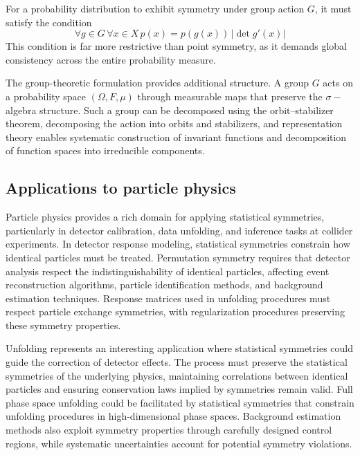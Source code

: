         For a probability distribution to exhibit symmetry under group action \(G\), it must satisfy the condition
        \[
            \forall g\in G\,\forall x\in X\,p(x) = p(g(x))\,|\det g'(x)|
        \]
        This condition is far more restrictive than point symmetry, as it demands global consistency across the entire probability measure.

        The group-theoretic formulation provides additional structure.
        A group \(G\) acts on a probability space \((\Omega, F, \mu)\) through measurable maps that preserve the \(\sigma-\)algebra structure.
        Such a group can be decomposed using the orbit--stabilizer theorem, decomposing the action into orbits and stabilizers, and representation theory enables systematic construction of invariant functions and decomposition of function spaces into irreducible components.
        
    \subsection{Applications to particle physics}
        Particle physics provides a rich domain for applying statistical symmetries, particularly in detector calibration, data unfolding, and inference tasks at collider experiments.
        In detector response modeling, statistical symmetries constrain how identical particles must be treated. 
        Permutation symmetry requires that detector analysis respect the indistinguishability of identical particles, affecting event reconstruction algorithms, particle identification methods, and background estimation techniques. 
        Response matrices used in unfolding procedures must respect particle exchange symmetries, with regularization procedures preserving these symmetry properties.

        Unfolding represents an interesting application where statistical symmetries could guide the correction of detector effects.
        The process must preserve the statistical symmetries of the underlying physics, maintaining correlations between identical particles and ensuring conservation laws implied by symmetries remain valid.
        Full phase space unfolding could be facilitated by statistical symmetries that constrain unfolding procedures in high-dimensional phase spaces.
        Background estimation methods also exploit symmetry properties through carefully designed control regions, while systematic uncertainties account for potential symmetry violations.

